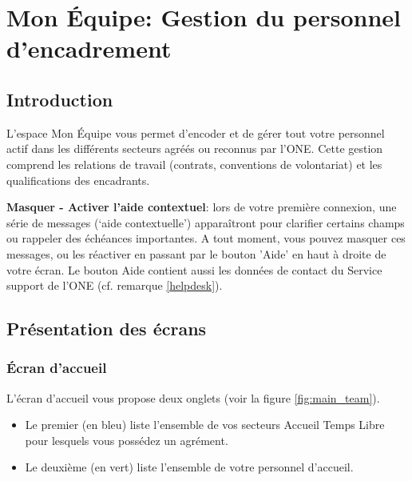 \chapter{Mon Équipe: Gestion du personnel d'encadrement}\label{chap:team}
\minitoc

\section{Introduction}
L'espace Mon Équipe vous permet d’encoder et de gérer tout votre personnel actif dans les différents secteurs agréés ou reconnus par l’ONE. Cette gestion comprend les relations de travail (contrats, conventions de volontariat) et les qualifications des encadrants.



\begin{info}
\textbf{Masquer - Activer l'aide contextuel}: 
lors de votre première connexion, une série de messages (‘aide contextuelle’) apparaîtront pour clarifier certains champs ou rappeler des échéances importantes. A tout moment, vous pouvez masquer ces messages, ou les réactiver en passant par le bouton 'Aide' en haut à droite de votre écran. Le bouton Aide contient aussi les données de contact du Service support de l'ONE (cf. remarque \ref{helpdesk}). 
\end{info}


\section{Présentation des écrans}
\subsection{Écran d'accueil}
L'écran d'accueil vous propose deux onglets (voir la figure \ref{fig:main_team}). 
\begin{itemize}
    \item Le premier (\textcolor{bleu}{en bleu}) liste l'ensemble de vos secteurs Accueil Temps Libre pour lesquels vous possédez un agrément.
    \item Le deuxième (\textcolor{vert}{en vert}) liste l'ensemble de votre personnel d'accueil.
\end{itemize}

